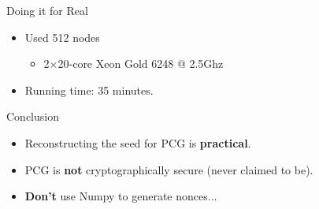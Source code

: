 \begin{frame}[label=bragging]{Doing it for Real}
  \begin{itemize}
    \item Used 512 nodes
      \begin{itemize}
      \item 2$\times$20-core \textsf{Xeon Gold 6248 @ 2.5Ghz}
      \end{itemize}
    \item Running time: 35 minutes.
    \end{itemize}
  \end{frame}


  \begin{frame}{Conclusion}

  \begin{itemize}
    \item Reconstructing the seed for PCG is \textbf{practical}.
    \item PCG is \textbf{not} cryptographically secure (never claimed to be).
    \item \textbf{Don't} use \textsf{Numpy} to generate nonces...
    \end{itemize}
    
\end{frame}
  
  
